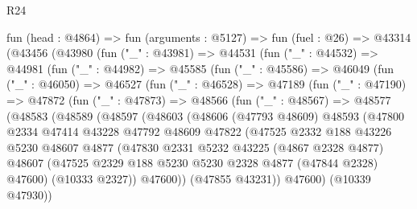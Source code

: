 \begin{lexlean}{R24}
\begin{coremodule}
  fun (head : @4864) =>
  fun (arguments : @5127) =>
  fun (fuel : @26) =>
  @43314
    (@43456
      (@43980
        (fun ("_" : @43981) =>
        @44531
          (fun ("_" : @44532) =>
          @44981
            (fun ("_" : @44982) =>
            @45585
              (fun ("_" : @45586) =>
              @46049
                (fun ("_" : @46050) =>
                @46527
                  (fun ("_" : @46528) =>
                  @47189
                    (fun ("_" : @47190) =>
                    @47872
                      (fun ("_" : @47873) =>
                      @48566
                        (fun ("_" : @48567) =>
                        @48577
                          (@48583
                            (@48589
                              (@48597
                                (@48603
                                  (@48606
                                    (@47793 @48609)
                                    @48593
                                    (@47800
                                      @2334
                                      @47414
                                      @43228
                                      @47792
                                      @48609
                                      @47822
                                      (@47525
                                        @2332
                                        @188
                                        @43226
                                        @5230
                                        @48607
                                        @4877
                                        (@47830
                                          @2331
                                          @5232
                                          @43225
                                          (@4867 @2328 @4877)
                                          @48607
                                          (@47525
                                            @2329
                                            @188
                                            @5230
                                            @5230
                                            @2328
                                            @4877
                                            (@47844 @2328)
                                            @47600)
                                          (@10333 @2327))
                                        @47600))
                                    (@47855 @43231))
                                  @47600)
                                (@10339 @47930))

\end{coremodule}
\end{lexlean}
